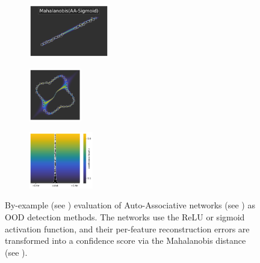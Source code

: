 \begin{figure}[H]
    \begin{subfigure}
        \centering
        \includegraphics[width=0.388\textwidth,valign=t]{ood-detection/figures/ood-detection/confidence-line-aa-sigmoid-mahalanobis.pdf}
    \end{subfigure}
    \begin{subfigure}
        \centering
        \includegraphics[width=0.254\textwidth,valign=t]{ood-detection/figures/ood-detection/confidence-circle-aa-sigmoid-mahalanobis.pdf}
    \end{subfigure}
    \begin{subfigure}
        \centering
        \includegraphics[width=0.308\textwidth,valign=t]{ood-detection/figures/ood-detection/confidence-haystack-aa-sigmoid-mahalanobis.pdf}
    \end{subfigure}

    \caption[Comparison of Mahalanobis-transformed Auto-Associative Networks as OOD detection methods]{By-example (see ) evaluation of Auto-Associative networks (see ) as OOD detection methods. The networks use the ReLU or sigmoid activation function, and their per-feature reconstruction errors are transformed into a confidence score via the Mahalanobis distance (see ).}
    \label{fig:auto-associative-mahalanobis-ood-detection}
\end{figure}

